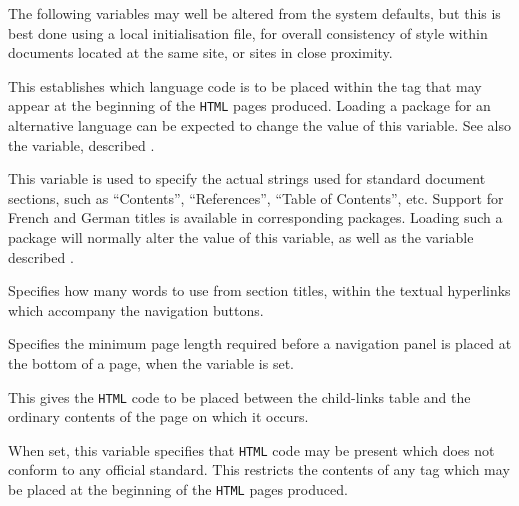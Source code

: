 \bigskip\noindent
The following variables may well be altered from the system defaults,
but this is best done using a local  initialisation file,
for overall consistency of style within documents located at the same site,
or sites in close proximity.

\begin{htmllist}%
%
\item [\fn{\$default\_language}\texttt{ = 'english';}\label{isolanguage}]
This establishes which language code is to be placed within
the  tag that may appear at the beginning
of the \texttt{HTML} pages produced. Loading a package for
an alternative language can be expected to change the value of this variable.\html{\\}
See also the  variable, described .


\item [\fn{\$TITLES\_LANGUAGE}\texttt{ = 'english';}\label{doclanguage}]
This variable is used to specify the actual strings used for standard document
sections, such as ``Contents'', ``References'', ``Table of Contents'', etc.\html{\\}
Support for French and German titles is available in corresponding packages.
Loading such a package will normally alter the value of this variable, as well as 
the  variable described .


\item [\fn{\$WORDS\_IN\_NAVIGATION\_PANEL\_TITLES}\texttt{ = 4;}]
Specifies how many words to use from section titles,
within the textual hyperlinks which accompany the navigation buttons.


\item [\fn{\$WORDS\_IN\_PAGE}\texttt{ = 450;}]
Specifies the minimum page length required before a navigation panel
is placed at the bottom of a page,
when the  variable is set.


\item [\fn{\$CHILDLINE}\texttt{ = \char34<BR><HR>\char92n\char34;}]
This gives the \texttt{HTML} code to be placed between the child-links
table and the ordinary contents of the page on which it occurs.


\item [\fn{\$NETSCAPE\_HTML}\texttt{ = 0;}]
When set, this variable specifies that \texttt{HTML} code may be present which
does not conform to any official standard. 
This restricts the contents of any  tag which may be placed
at the beginning of the \texttt{HTML} pages produced.



\end{htmllist}
